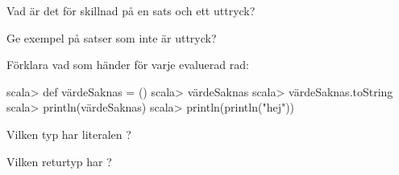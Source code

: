 \begin{ConceptConnections}[0.3\textwidth]

\end{ConceptConnections}

\SOLUTION

\TaskSolved \what

\begin{ConceptConnections}

\end{ConceptConnections}

%
%
%
%
%
%
%
%
%
%
%
%
%
%
%
%
%
%
%
%
%
%
%
%


\QUESTEND





\QUESTBEGIN

\Task \what

\Subtask Vad är det för skillnad på en sats och ett uttryck?

\Subtask Ge exempel på satser som inte är uttryck?

\Subtask Förklara vad som händer för varje evaluerad rad:
\begin{REPL}
scala> def värdeSaknas = ()
scala> värdeSaknas
scala> värdeSaknas.toString
scala> println(värdeSaknas)
scala> println(println("hej"))
\end{REPL}

\Subtask Vilken typ har literalen \code{()}?

\Subtask Vilken returtyp har ?

\SOLUTION

